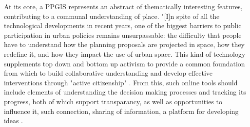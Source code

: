 At its core, a PPGIS represents an abstract of thematically interesting features, contributing to a communal understanding of place\cite{Brown2012}. %
"[I]n spite of all the technological developments in recent years, one of the biggest barriers to public participation in urban policies remains unsurpassable: the difficulty that people have to understand how the planning proposals are projected in space, how they redefine it, and how they impact the use of urban space\cite{Painho2013}. %
This kind of technology supplements top down and bottom up activism to provide a common foundation from which to build collaborative understanding and develop effective interventions through "active citizenship" \cite{Kleinhans2015}.%
From this, such online tools should include elements of understanding the decision making processes and tracking its progress, both of which support transparancy, as well as opportunities to influence it, such connection, sharing of information, a platform for developing ideas \cite{Afzalan2017}. %


